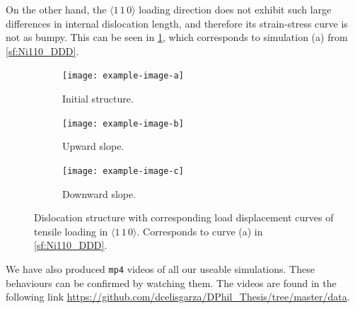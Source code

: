 On the other hand, the $\langle 1\, 1\, 0 \rangle$ loading direction does not exhibit such large differences in internal dislocation length, and therefore its strain-stress curve is not as bumpy. This can be seen in \cref{f:Ni110_bumps}, which corresponds to simulation (a) from \cref{sf:Ni110_DDD}.
\begin{figure}
    \centering
    \begin{subfigure}[t]{\linewidth}
        \centering
        \texttt{[image: example-image-a]}
        \caption{Initial structure.}
    \end{subfigure}

    \begin{subfigure}[t]{\linewidth}
        \centering
        \texttt{[image: example-image-b]}
        \caption{Upward slope.}
    \end{subfigure}

    \begin{subfigure}[t]{\linewidth}
        \centering
        \texttt{[image: example-image-c]}
        \caption{Downward slope.}
    \end{subfigure}
    \caption[Dislocation structure with corresponding load displacement curves of tensile loading in $\langle 1\, 1\, 0 \rangle$.]{Dislocation structure with corresponding load displacement curves of tensile loading in $\langle 1\, 1\, 0 \rangle$. Corresponds to curve (a) in \cref{sf:Ni110_DDD}.}
    \label{f:Ni110_bumps}
\end{figure}

We have also produced \texttt{mp4} videos of all our useable simulations. These behaviours can be confirmed by watching them. The videos are found in the following link \href{https://github.com/dcelisgarza/DPhil_Thesis/tree/master/data}{https://github.com/dcelisgarza/DPhil\_Thesis/tree/master/data}.

